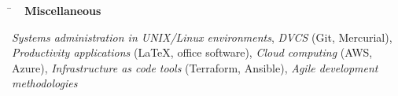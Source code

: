 \documentclass[10pt]{article} %
\newlength{\smallertextwidth}
\newcommand{\sqbullet}{~\vrule height 1ex width .8ex depth -.2ex} %
\newcommand{\skillgroup}[2]{
\begin{tabbing}
\hspace{5mm} \= \kill
\sqbullet \>\+ \textbf{#1}\\
\begin{minipage}{\smallertextwidth}
\vspace{2mm}
#2
\end{minipage}
\end{tabbing}
}
\newcommand{\interestsgroup}[1]{
\begin{tabbing}%
\hspace{5mm}\=\kill%
#1%
\end{tabbing}
\vspace{-10mm}
}
\newcommand{\reference}[4]{
\parbox[t]{0.5\textwidth}{
\begin{tabbing}
\hspace{2cm} \= \hspace{4cm} \= \kill
\textbf{Name} \> #1\\
\textbf{Company} \> #2\\
\textbf{Position} \> #3\\
\textbf{Contact} \> \href{mailto:{#4}}{#4}
\end{tabbing}
}}
\begin{document}

\skillgroup{Miscellaneous}
{
\textit{Systems administration in UNIX/Linux environments},
\textit{DVCS} (Git, Mercurial), 
\textit{Productivity applications} (LaTeX, office software),
\textit{Cloud computing} (AWS, Azure),
\textit{Infrastructure as code tools} (Terraform, Ansible),
\textit{Agile development methodologies}
}





%
%

\end{document}
